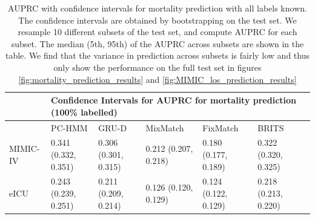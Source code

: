 \begin{table}[!h]
\begin{tabular}{|l|l|l|l|l|l|l}
\hline
         & \multicolumn{5}{l|}{Confidence Intervals for AUPRC for mortality prediction (100\% labelled)}                                  \\ 
         \hline
         & PC-HMM & GRU-D & MixMatch & FixMatch & BRITS \\ 
         \hline
MIMIC-IV & 0.341 (\scriptsize{0.332, 0.351}) & 0.306 (\scriptsize{0.301, 0.315}) & 0.212 (\scriptsize{0.207, 0.218}) & 0.180 (\scriptsize{0.177, 0.189}) & 0.322 (\scriptsize{0.320, 0.325})  \\ 
\hline
eICU    & 0.243 (\scriptsize{0.239, 0.251}) & 0.211 (\scriptsize{0.209, 0.214}) &  0.126 (\scriptsize{0.120, 0.129})&  0.124 (\scriptsize{0.122, 0.129})&  0.218 (\scriptsize{0.213, 0.220}) \\ 
\hline
\end{tabular}
  \caption[AUPRC with confidence intervals for mortality prediction with all labels known]{AUPRC with confidence intervals for mortality prediction with all labels known. The confidence intervals are obtained by bootstrapping on the test set. We resample 10 different subsets of the test set, and compute AUPRC for each subset. The median (5th, 95th) of the AUPRC across subsets are shown in the table. We find that the variance in prediction across subsets is fairly low and thus only show the performance on the full test set in figures \ref{fig:mortality_prediction_results} and \ref{fig:MIMIC_los_prediction_results}}
    \label{table: CI_performance}
\end{table}